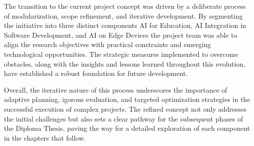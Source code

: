 The transition to the current project concept was driven by a deliberate process of modularization, scope refinement, 
and iterative development. By segmenting the initiative into three distinct components AI for Education, AI Integration in Software Development, 
and AI on Edge Devices the project team was able to align the research objectives with practical constraints and emerging technological opportunities. 
The strategic measures implemented to overcome obstacles, along with the insights and lessons learned throughout this evolution, 
have established a robust foundation for future development.

Overall, the iterative nature of this process underscores the importance of adaptive planning, 
igorous evaluation, and targeted optimization strategies in the successful execution of complex projects. 
The refined concept not only addresses the initial challenges but also sets a clear pathway for the subsequent phases of the Diploma Thesis, 
paving the way for a detailed exploration of each component in the chapters that follow.

